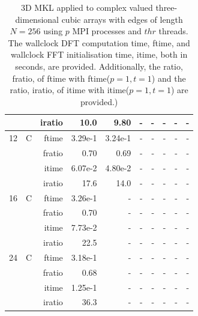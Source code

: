 \documentclass[a4paper]{article}
\begin{document}
\begin{table}[htbp]
\begin{center}
\begin{small}
\begin{tabular}{|r|r|r|r|r|r|r|r|r|r|}
             &             &  iratio &    10.0 &   9.80  &      - &      - &      - &      - &      - \\\hline
   12 &   C &  ftime &    3.29e-1 &    3.24e-1 &      - &      - &      - &      - &      - \\
             &             &  fratio &    0.70 &    0.69 &      - &      - &      - &      - &      - \\
             &             &  itime &    6.07e-2 &    4.80e-2 &      - &      - &      - &      - &      - \\
             &             &  iratio &    17.6 &   14.0 &     - &      - &      - &      - &      - \\\hline
   16 &   C &  ftime &    3.26e-1 &      - &      - &      - &      - &      - &      - \\
             &             &  fratio &    0.70 &      - &      - &      - &      - &      - &      - \\
             &             &  itime &    7.73e-2 &      - &      - &      - &      - &      - &      - \\
             &             &  iratio &   22.5 &     - &      - &      - &      - &      - &      - \\\hline
   24 &   C &  ftime &    3.18e-1 &      - &      - &      - &      - &      - &      - \\
             &             &  fratio &    0.68 &      - &      - &      - &      - &      - &      - \\
             &             &  itime &    1.25e-1 &      - &      - &      - &      - &      - &      - \\
             &             &  iratio &    36.3 &     - &      - &      - &      - &      - &      - \\\hline

\end{tabular}
\caption{3D MKL applied to complex valued three-dimensional cubic arrays with edges of length $N=256$ using $p$ MPI processes and $thr$ threads. The wallclock DFT computation time, ftime, and wallclock FFT initialisation time, itime, both in seconds, are provided. Additionally, the ratio, fratio, of ftime  with ftime($p=1,t=1$) and the ratio, iratio, of itime  with itime($p=1,t=1$) are provided.) }\label{Tbl:MKL3d256c}
\end{small}
\end{center}
\end{table}
\end{document}

